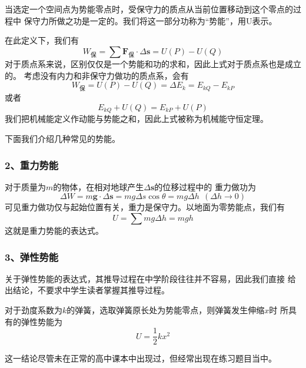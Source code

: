 \begin{definition}
    当选定一个空间点为势能零点时，受保守力的质点从当前位置移动到这个零点的过程中
    保守力所做之功是一定的。我们将这一部分功称为“势能”，用U表示。
\end{definition}

在此定义下，我们有
\begin{equation}
    W_{\text{保}}=\sum \boldsymbol{F_{\text{保}}}\cdot \Delta \boldsymbol{s}
    =U(P)-U(Q)
\end{equation}
对于质点系来说，区别仅仅是一个势能和功的求和，因此上式对于质点系也是成立的。
考虑没有内力和非保守力做功的质点系，会有 
\begin{equation}
    W_{\text{保}}=U(P)-U(Q)=\Delta E_k=E_{kQ}-E_{kP}
\end{equation}
或者
\begin{equation}
    E_{kQ}+U(Q)=E_{kP}+U(P)
\end{equation}
我们把机械能定义作动能与势能之和，因此上式被称为机械能守恒定理。

下面我们介绍几种常见的势能。
\subsubsection*{2、重力势能}
对于质量为$m$的物体，在相对地球产生$\Delta \boldsymbol{s}$的位移过程中的
重力做功为
\begin{equation}
    \Delta W=m\boldsymbol{g}\cdot \Delta \boldsymbol{s}=
    mg\Delta s\cos\theta=mg\Delta h~~(\Delta h\to 0)
\end{equation}
可见重力做功仅与起始位置有关，重力是保守力。以地面为零势能点，我们有 
\begin{equation}
    U=\sum mg\Delta h=mgh
\end{equation}
这就是重力势能的表达式。
\subsubsection*{3、弹性势能}
关于弹性势能的表达式，其推导过程在中学阶段往往并不容易，因此我们直接
给出结论，不要求中学生读者掌握其推导过程。

\begin{theorem}
    对于劲度系数为$k$的弹簧，选取弹簧原长处为势能零点，则弹簧发生伸缩$x$时
    所具有的弹性势能为
    \begin{equation}
        U=\frac{1}{2}kx^2
    \end{equation}
\end{theorem}

这一结论尽管未在正常的高中课本中出现过，但经常出现在练习题目当中。
